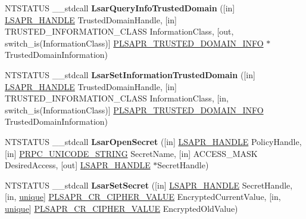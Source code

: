\begin{DoxyCompactItemize}
N\+T\+S\+T\+A\+T\+US \+\_\+\+\_\+stdcall {\bfseries Lsar\+Query\+Info\+Trusted\+Domain} (\mbox{[}in\mbox{]} \hyperlink{interfacevoid}{L\+S\+A\+P\+R\+\_\+\+H\+A\+N\+D\+LE} Trusted\+Domain\+Handle, \mbox{[}in\mbox{]} T\+R\+U\+S\+T\+E\+D\+\_\+\+I\+N\+F\+O\+R\+M\+A\+T\+I\+O\+N\+\_\+\+C\+L\+A\+SS Information\+Class, \mbox{[}out, switch\+\_\+is(Information\+Class)\mbox{]} \hyperlink{union___l_s_a_p_r___t_r_u_s_t_e_d___d_o_m_a_i_n___i_n_f_o}{P\+L\+S\+A\+P\+R\+\_\+\+T\+R\+U\+S\+T\+E\+D\+\_\+\+D\+O\+M\+A\+I\+N\+\_\+\+I\+N\+FO} $\ast$Trusted\+Domain\+Information)
\item 
\mbox{\label{interfacelsarpc_ad5552a093724a86be5e0508c3740f813}} 
N\+T\+S\+T\+A\+T\+US \+\_\+\+\_\+stdcall {\bfseries Lsar\+Set\+Information\+Trusted\+Domain} (\mbox{[}in\mbox{]} \hyperlink{interfacevoid}{L\+S\+A\+P\+R\+\_\+\+H\+A\+N\+D\+LE} Trusted\+Domain\+Handle, \mbox{[}in\mbox{]} T\+R\+U\+S\+T\+E\+D\+\_\+\+I\+N\+F\+O\+R\+M\+A\+T\+I\+O\+N\+\_\+\+C\+L\+A\+SS Information\+Class, \mbox{[}in, switch\+\_\+is(Information\+Class)\mbox{]} \hyperlink{union___l_s_a_p_r___t_r_u_s_t_e_d___d_o_m_a_i_n___i_n_f_o}{P\+L\+S\+A\+P\+R\+\_\+\+T\+R\+U\+S\+T\+E\+D\+\_\+\+D\+O\+M\+A\+I\+N\+\_\+\+I\+N\+FO} Trusted\+Domain\+Information)
\item 
\mbox{\label{interfacelsarpc_a5e2596341ca2c668d0e98917530511cb}} 
N\+T\+S\+T\+A\+T\+US \+\_\+\+\_\+stdcall {\bfseries Lsar\+Open\+Secret} (\mbox{[}in\mbox{]} \hyperlink{interfacevoid}{L\+S\+A\+P\+R\+\_\+\+H\+A\+N\+D\+LE} Policy\+Handle, \mbox{[}in\mbox{]} \hyperlink{struct___r_p_c___u_n_i_c_o_d_e___s_t_r_i_n_g}{P\+R\+P\+C\+\_\+\+U\+N\+I\+C\+O\+D\+E\+\_\+\+S\+T\+R\+I\+NG} Secret\+Name, \mbox{[}in\mbox{]} A\+C\+C\+E\+S\+S\+\_\+\+M\+A\+SK Desired\+Access, \mbox{[}out\mbox{]} \hyperlink{interfacevoid}{L\+S\+A\+P\+R\+\_\+\+H\+A\+N\+D\+LE} $\ast$Secret\+Handle)
\item 
\mbox{\label{interfacelsarpc_aeb8e678ffacb51b94e5888832e5a6e9c}} 
N\+T\+S\+T\+A\+T\+US \+\_\+\+\_\+stdcall {\bfseries Lsar\+Set\+Secret} (\mbox{[}in\mbox{]} \hyperlink{interfacevoid}{L\+S\+A\+P\+R\+\_\+\+H\+A\+N\+D\+LE} Secret\+Handle, \mbox{[}in, \hyperlink{interfaceunique}{unique}\mbox{]} \hyperlink{struct___l_s_a_p_r___c_r___c_i_p_h_e_r___v_a_l_u_e}{P\+L\+S\+A\+P\+R\+\_\+\+C\+R\+\_\+\+C\+I\+P\+H\+E\+R\+\_\+\+V\+A\+L\+UE} Encrypted\+Current\+Value, \mbox{[}in, \hyperlink{interfaceunique}{unique}\mbox{]} \hyperlink{struct___l_s_a_p_r___c_r___c_i_p_h_e_r___v_a_l_u_e}{P\+L\+S\+A\+P\+R\+\_\+\+C\+R\+\_\+\+C\+I\+P\+H\+E\+R\+\_\+\+V\+A\+L\+UE} Encrypted\+Old\+Value)

\end{DoxyCompactItemize}
